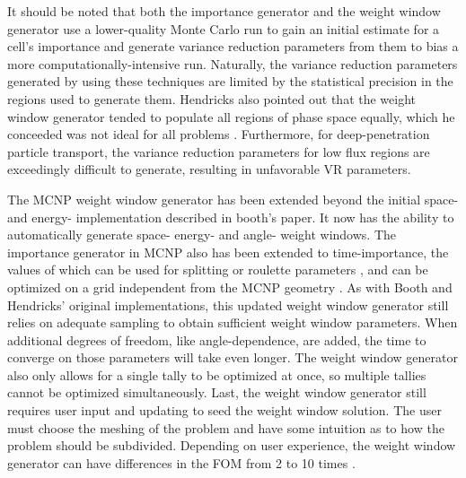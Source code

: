 It should be noted that both the importance generator and the weight window
generator use a lower-quality
Monte Carlo run to gain an initial estimate for a cell's importance and generate
variance reduction parameters from them to bias a more computationally-intensive
run. Naturally, the variance reduction parameters generated by using these
techniques are limited by the statistical precision in the regions used to
generate them. Hendricks also pointed out that the weight window generator
tended to populate all regions of phase space equally, which he conceeded was
not ideal for all problems \cite{hendricks_code-generated_1982}.
Furthermore, for deep-penetration particle transport, the
variance reduction parameters for low flux regions are exceedingly difficult to
generate, resulting in unfavorable VR parameters.

The MCNP \cite{mcnp_manual_v1, brown_mcnp_2002} weight window generator has been
extended beyond the initial space- and energy- implementation described in
booth's paper. It now has the ability to automatically generate space- energy-
and angle- weight windows. The importance generator in MCNP also has been
extended to time-importance, the values of which can be used for splitting or
roulette parameters \cite{brown_mcnp_2002}, and can be optimized on a grid
independent from the MCNP geometry \cite{evans_enhanced_1998}.
As with Booth and Hendricks'
original implementations, this updated weight window generator still relies on
adequate sampling to obtain sufficient weight window parameters. When additional
degrees of freedom, like angle-dependence, are added, the time
to converge on those parameters will take even longer. The weight window
generator also only allows for a single tally to be optimized at once, so
multiple tallies cannot be optimized simultaneously. Last, the weight window
generator still requires user input and updating to seed the weight
window solution. The user must choose the meshing of the problem and have some
intuition as to how the problem should be subdivided. Depending on user
experience, the weight window generator can have differences in the FOM from 2
to 10 times \cite{van_riper_generation_1995}.

